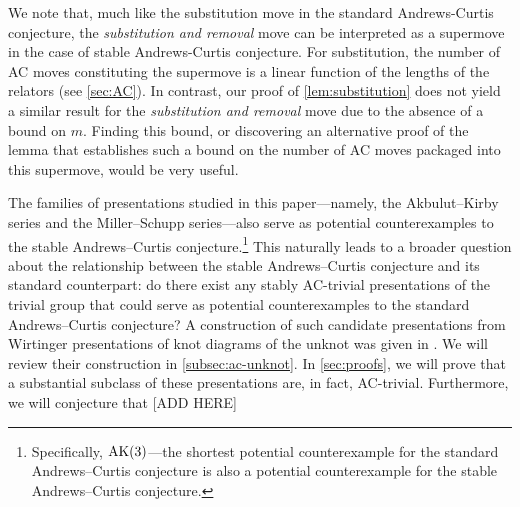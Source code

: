 We note that, much like the substitution move in the standard Andrews-Curtis conjecture, the \emph{substitution and removal} move can be interpreted as a supermove in the case of stable Andrews-Curtis conjecture. For substitution, the number of AC moves constituting the supermove is a linear function of the lengths of the relators (see \autoref{sec:AC}). In contrast, our proof of \autoref{lem:substitution} does not yield a similar result for the \emph{substitution and removal} move due to the absence of a bound on $m$. Finding this bound, or discovering an alternative proof of the lemma that establishes such a bound on the number of AC moves packaged into this supermove, would be very useful.

The families of presentations studied in this paper---namely, the Akbulut--Kirby series and the Miller--Schupp series---also serve as potential counterexamples to the stable Andrews--Curtis conjecture.\footnote{Specifically, $\text{AK}(3)$---the shortest potential counterexample for the standard Andrews--Curtis conjecture is also a potential counterexample for the stable Andrews--Curtis conjecture.}
This naturally leads to a broader question about the relationship between the stable Andrews--Curtis conjecture and its standard counterpart: do there exist any stably AC-trivial presentations of the trivial group that could serve as potential counterexamples to the standard Andrews--Curtis conjecture? 
A construction of such candidate presentations from Wirtinger presentations of knot diagrams of the unknot was given in \cite{MMS}. We will review their construction in \autoref{subsec:ac-unknot}. In \autoref{sec:proofs}, we will prove that a substantial subclass of these presentations are, in fact, AC-trivial. 
Furthermore, we will conjecture that [ADD HERE]




